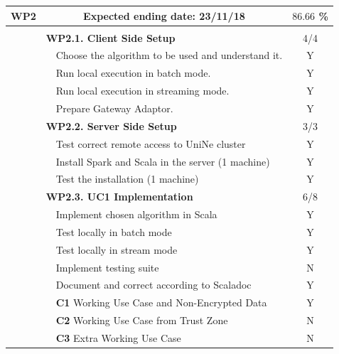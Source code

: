 \documentclass{article}
\newcommand{\lline}[1]{\hline\multicolumn{#1}{c}{}\\[-1.34em]\hline}
\begin{document}
\begin{longtable}{lm{5cm}m{7cm}c}
\textbf{WP2} & \multicolumn{2}{c}{Expected ending date: 23/11/18} & $86.66$ \% \\[3pt]\lline{4} %
& \multicolumn{2}{l}{\textbf{WP2.1. Client Side Setup}} & 4/4 \\[3pt] \hline
& & Choose the algorithm to be used and understand it. & Y \\[3pt]
& & Run local execution in batch mode. & Y \\[3pt]
& & Run local execution in streaming mode. & Y \\[3pt]
& & Prepare Gateway Adaptor. & Y \\[3pt] \hline
& \multicolumn{2}{l}{\textbf{WP2.2. Server Side Setup}} & 3/3 \\[3pt] \hline
& & Test correct remote access to UniNe cluster & Y \\[3pt]
& & Install Spark and Scala in the server (1 machine) & Y \\[3pt]
& & Test the installation (1 machine) & Y \\[3pt] \hline
& \multicolumn{2}{l}{\textbf{WP2.3. UC1 Implementation}} & 6/8 \\[3pt] \hline
& & Implement chosen algorithm in Scala & Y \\[3pt]
& & Test locally in batch mode & Y \\[3pt]
& & Test locally in stream mode & Y \\[3pt]
& & Implement testing suite & N \\[3pt]
& & Document and correct according to Scaladoc & Y \\[3pt]
& & \textbf{C1} Working Use Case and Non-Encrypted Data & Y \\[3pt]
& & \textbf{C2} Working Use Case from Trust Zone & N \\[3pt]
& & \textbf{C3} Extra Working Use Case & N \\[6pt] \hline


\end{longtable}
\end{document}
